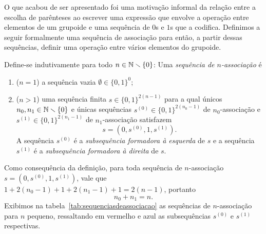 O que acabou de ser apresentado foi uma motivação informal da relação entre a escolha de parênteses ao escrever uma expressão que envolve a operação entre elementos de um grupoide e uma sequência de $0$s e $1$s que a codifica. Definimos a seguir formalmente uma sequência de associação para então, a partir dessas sequências, definir uma operação entre vários elementos do grupoide.

\begin{definition}
Define-se indutivamente para todo $n \in \mathbb{N} \smallsetminus \{0\}$:
Uma \emph{sequência de $n$-associação} é
	\begin{enumerate}
	\item ($n=1$) a sequência vazia $\emptyset \in \{0,1\}^{0}$;
	\item ($n>1$) uma sequência finita $s \in \{0,1\}^{2(n-1)}$ para a qual únicos $n_0, n_1 \in \mathbb{N} \smallsetminus \{0\}$ e únicas sequências $s^{(0)} \in \{0,1\}^{2(n_0-1)}$ de $n_0$-associação e $s^{(1)} \in \{0,1\}^{2(n_1-1)}$ de $n_1$-associação satisfazem
		\begin{equation*}
		s=(0,s^{(0)},1,s^{(1)}).
		\end{equation*}
	A sequência $s^{(0)}$ é a \emph{subsequência formadora à esquerda} de $s$ e a sequência $s^{(1)}$ é a \emph{subsequência formadora à direita} de $s$.
	\end{enumerate}
\end{definition}

Como consequência da definição, para toda sequência de $n$-associação $s=(0,s^{(0)},1,s^{(1)})$, vale que $1 + 2(n_0-1) + 1 + 2(n_1-1) + 1 = 2(n-1)$, portanto
	\begin{equation*}
	n_0 + n_1 = n.
	\end{equation*}
Exibimos na tabela~\ref{tab:sequenciasdeassociacao} as sequências de $n$-associação para $n$ pequeno, ressaltando em vermelho e azul as subsequências $s^{(0)}$ e $s^{(1)}$ respectivas.

